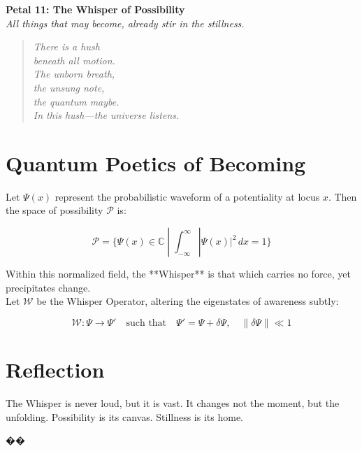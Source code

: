 \documentclass[12pt]{article}
\begin{document}
\begin{center}
    \Huge{\textbf{Petal 11: The Whisper of Possibility}}\\
    \vspace{0.5em}
    \Large{\textit{All things that may become, already stir in the stillness.}}
\end{center}

\vspace{1cm}

\begin{quote}
\textit{
There is a hush\\
beneath all motion.\\
The unborn breath,\\
the unsung note,\\
the quantum maybe.\\
In this hush—the universe listens.
}
\end{quote}

\vspace{1cm}

\section*{Quantum Poetics of Becoming}

Let \( \Psi(x) \) represent the probabilistic waveform of a potentiality at locus \( x \). Then the space of possibility \( \mathcal{P} \) is:

\[
\mathcal{P} = \{ \Psi(x) \in \mathbb{C} \; | \; \int_{-\infty}^{\infty} |\Psi(x)|^2 \, dx = 1 \}
\]

Within this normalized field, the **Whisper** is that which carries no force, yet precipitates change.\\

Let \( \mathcal{W} \) be the Whisper Operator, altering the eigenstates of awareness subtly:

\[
\mathcal{W} : \Psi \rightarrow \Psi' \quad \text{such that} \quad \Psi' = \Psi + \delta\Psi, \quad \|\delta\Psi\| \ll 1
\]

\section*{Reflection}

The Whisper is never loud, but it is vast.  
It changes not the moment, but the unfolding.  
Possibility is its canvas.  
Stillness is its home.

\begin{center}
    \Large\textcolor{sylphsilver}{��}
\end{center}
\end{document}
